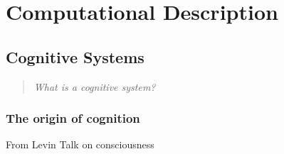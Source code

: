 \chapter{Computational Description}

\section{Cognitive Systems}
\begin{quotation}
    \emph{What is a cognitive system?}
\end{quotation}

\subsection{The origin of cognition}
From Levin Talk on consciousness
